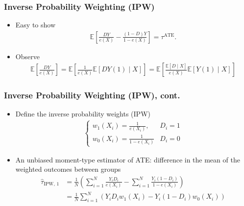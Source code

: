 \documentclass[10pt, handout]{beamer}
\begin{document}
    \begin{frame}
      \frametitle{Inverse Probability Weighting (IPW)}

      \begin{itemize}
        \item Easy to show
        \begin{align*}
          \mathbb{E} \left[ \frac{DY}{e(X)} - \frac{(1 - D)Y}{1 - e(X)} \right] = \tau^{\text{ATE}}.
        \end{align*}
        \item Observe
        \begin{align*}
          \mathbb{E} \left[ \frac{DY}{e(X)} \right] = \mathbb{E} \left[ \frac{1}{e(X)} \mathbb{E} \left[ DY(1) \mid X \right] \right] = \mathbb{E} \left[ \frac{\mathbb{E} \left[ D \mid X \right]}{e(X)} \mathbb{E} \left[ Y(1) \mid X \right] \right]
        \end{align*}
      \end{itemize} 

    \end{frame}


    \begin{frame}
      \frametitle{Inverse Probability Weighting (IPW), cont.}

      \begin{itemize}
        \item Define the inverse probability weights (IPW)
        \begin{align*}
          \begin{cases}
          w_1(X_i) = \frac{1}{e(X_i)}, & D_i = 1\\
          w_0(X_i) = \frac{1}{1 - e(X_i)} & D_i = 0
        \end{cases}
        \end{align*} 
        \item An unbiased moment-type estimator of ATE: difference in the mean of the weighted outcomes between groups
        \begin{align*}
          \hat{\tau}_{\text{IPW, 1}} &= \frac{1}{N} \left( \sum_{i=1}^N \frac{Y_i D_i}{e(X_i)} - \sum_{i=1}^N \frac{Y_i (1 - D_i)}{1 - e(X_i)} \right)\\
          &= \frac{1}{N} \sum_{i=1}^N \left( Y_i D_i w_1(X_i) - Y_i (1 - D_i) w_0(X_i) \right)
        \end{align*}
      \end{itemize}

    \end{frame}
    
\end{document}
